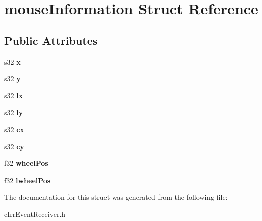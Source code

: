 \hypertarget{structmouse_information}{
\section{mouseInformation Struct Reference}
\label{structmouse_information}
}
\subsection*{Public Attributes}
\begin{DoxyCompactItemize}
\item 
\hypertarget{structmouse_information_aaf71492c5efb15ea248716bfc413165d}{
s32 {\bfseries x}}
\label{structmouse_information_aaf71492c5efb15ea248716bfc413165d}

\item 
\hypertarget{structmouse_information_a17e842d5062bde8d5b1c3e146c2a53d6}{
s32 {\bfseries y}}
\label{structmouse_information_a17e842d5062bde8d5b1c3e146c2a53d6}

\item 
\hypertarget{structmouse_information_af072c0c4e2934a89d1f3bf9f18b6a96a}{
s32 {\bfseries lx}}
\label{structmouse_information_af072c0c4e2934a89d1f3bf9f18b6a96a}

\item 
\hypertarget{structmouse_information_aa3476e953639b7fd41acb340392c38a6}{
s32 {\bfseries ly}}
\label{structmouse_information_aa3476e953639b7fd41acb340392c38a6}

\item 
\hypertarget{structmouse_information_aea1522a5474f49254ea1f1fb3daed183}{
s32 {\bfseries cx}}
\label{structmouse_information_aea1522a5474f49254ea1f1fb3daed183}

\item 
\hypertarget{structmouse_information_a77e8ea7aac90db324d1f222b62572b79}{
s32 {\bfseries cy}}
\label{structmouse_information_a77e8ea7aac90db324d1f222b62572b79}

\item 
\hypertarget{structmouse_information_a238a08d2c81e2d22ec9cca735baf7e94}{
f32 {\bfseries wheelPos}}
\label{structmouse_information_a238a08d2c81e2d22ec9cca735baf7e94}

\item 
\hypertarget{structmouse_information_adc94e863ffaae2935c7c4dc10227e06f}{
f32 {\bfseries lwheelPos}}
\label{structmouse_information_adc94e863ffaae2935c7c4dc10227e06f}

\end{DoxyCompactItemize}


The documentation for this struct was generated from the following file:\begin{DoxyCompactItemize}
\item 
cIrrEventReceiver.h\end{DoxyCompactItemize}
